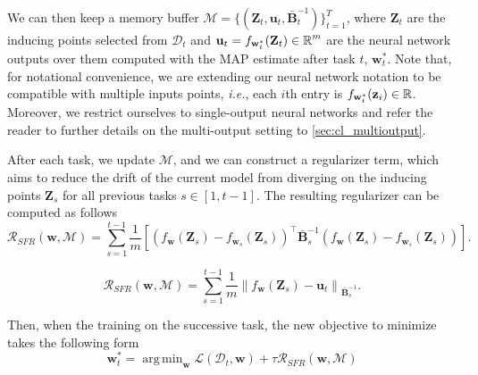 \documentclass{article}
\makeatletter
\newcommand{\ie}{\textit{i.e.\@}\xspace}
\newcommand{\dataset}{\ensuremath{\mathcal{D}}}
\newcommand{\weights}{\ensuremath{\mathbf{w}}}
\newcommand{\mbf}[1]{\mathbf{#1}}
\newcommand{\MB}{\mbf{B}}
\newcommand{\MZ}{\mbf{Z}}
\newcommand{\T}{\top}
\newcommand{\vz}{\mbf{z}}
\newcommand{\vu}{\mbf{u}}
\newcommand{\vw}{\mbf{w}}
\DeclareMathOperator*{\argmin}{arg\,min}
\makeatother
\begin{document}
We can then keep a memory buffer $\mathcal{M} = \{(\MZ_t, \vu_t, \bar{\MB}^{-1}_t)\}_{t=1}^T$, where $\MZ_t$ are the inducing points selected from $\dataset_t$ and  $\vu_t = f_{\vw_t^*}(\MZ_t)\in \R^{m}$ are the neural network outputs over them computed with the MAP estimate after task $t$, $\vw_t^*$. Note that, for notational convenience, we are extending our neural network notation to be compatible with multiple inputs points, \ie, each $i$th entry is $f_{\vw_t^*}(\vz_i)\in \R$. Moreover, we restrict ourselves to single-output neural networks and refer the reader to further details on the multi-output setting to \cref{sec:cl_multioutput}. 

After each task, we update $\mathcal{M}$, and we can construct a regularizer term, which aims to reduce the drift of the current model from diverging on the inducing points $\MZ_s$ for all previous tasks $ s \in \left[ 1, t-1 \right]$. The resulting regularizer can be computed as follows
\begin{equation}
	\mathcal{R}_\textit{SFR}(\weights, \mathcal{M}) = \sum_{s=1}^{t-1} \frac{1}{m} \left[\left(f_{\weights}(\MZ_{s}) - f_{\weights_{s}}(\MZ_s) \right)^\T \bar{\MB}^{-1}_{s} \left(f_{\weights}(\MZ_{s}) - f_{\weights_{s}}(\MZ_s) \right) \right].
\end{equation}

\begin{equation}
	\mathcal{R}_\textit{SFR}(\weights, \mathcal{M}) = \sum_{s=1}^{t-1} \frac{1}{m} 
	\left\lVert 
	f_{\weights}(\MZ_{s}) - \vu_t %
	\right\rVert_{\bar{\MB}^{-1}_{s}}.
\end{equation}

Then, when the training on the successive task, the new objective to minimize takes the following form
\begin{equation}
	\weights_t^* = \argmin_{\weights} \mathcal{L}(\mathcal{D}_t, \weights) + \tau \mathcal{R}_\textit{SFR}(\weights, \mathcal{M})
\end{equation}
\end{document}
